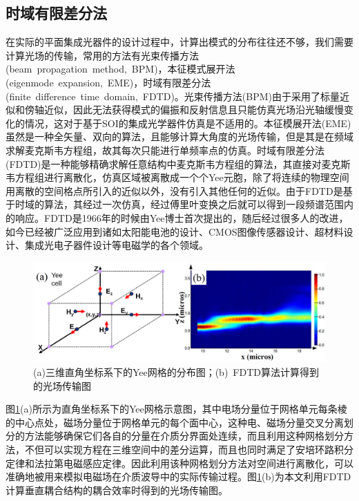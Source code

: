 \subsection{时域有限差分法}

在实际的平面集成光器件的设计过程中，计算出模式的分布往往还不够，我们需要计算光场的传输，常用的方法有光束传播方法(beam~propagation~method,~BPM)\cite{van1981beam}，本征模式展开法(eigenmode~expansion,~EME)\cite{gallagher2003eigenmode}，时域有限差分法(finite~difference~time~domain,~FDTD)\cite{yee1966numerical}。光束传播方法(BPM)由于采用了标量近似和傍轴近似，因此无法获得模式的偏振和反射信息且只能仿真光场沿光轴缓慢变化的情况，这对于基于SOI的集成光学器件仿真是不适用的。本征模展开法(EME)虽然是一种全矢量、双向的算法，且能够计算大角度的光场传输，但是其是在频域求解麦克斯韦方程组，故其每次只能进行单频率点的仿真。时域有限差分法(FDTD)是一种能够精确求解任意结构中麦克斯韦方程组的算法，其直接对麦克斯韦方程组进行离散化，仿真区域被离散成一个个Yee元胞，除了将连续的物理空间用离散的空间格点所引入的近似以外，没有引入其他任何的近似。由于FDTD是基于时域的算法，其经过一次仿真，经过傅里叶变换之后就可以得到一段频谱范围内的响应。FDTD是1966年的时候由Yee博士首次提出的，随后经过很多人的改进，如今已经被广泛应用到诸如太阳能电池的设计、CMOS图像传感器设计、超材料设计、集成光电子器件设计等电磁学的各个领域。

\begin{figure}[htb]
	\centering
	\includegraphics[width=16cm]{./Pictures/fab_yeecell.jpg}
	\captionsetup{justification=centering}
	\caption{(a)三维直角坐标系下的Yee网格的分布图\cite{fdtdsolution}；(b)~FDTD算法计算得到的光场传输图}
	\label{fab_yeecell}
\end{figure}

图\ref{fab_yeecell}(a)所示为直角坐标系下的Yee网格示意图，其中电场分量位于网格单元每条棱的中心点处，磁场分量位于网格单元的每个面中心，这种电、磁场分量交叉分离划分的方法能够确保它们各自的分量在介质分界面处连续，而且利用这种网格划分方法，不但可以实现方程在三维空间中的差分运算，而且也同时满足了安培环路积分定律和法拉第电磁感应定律。因此利用该种网格划分方法对空间进行离散化，可以准确地被用来模拟电磁场在介质波导中的实际传输过程。图\ref{fab_yeecell}(b)为本文利用FDTD计算垂直耦合结构的耦合效率时得到的光场传输图。

